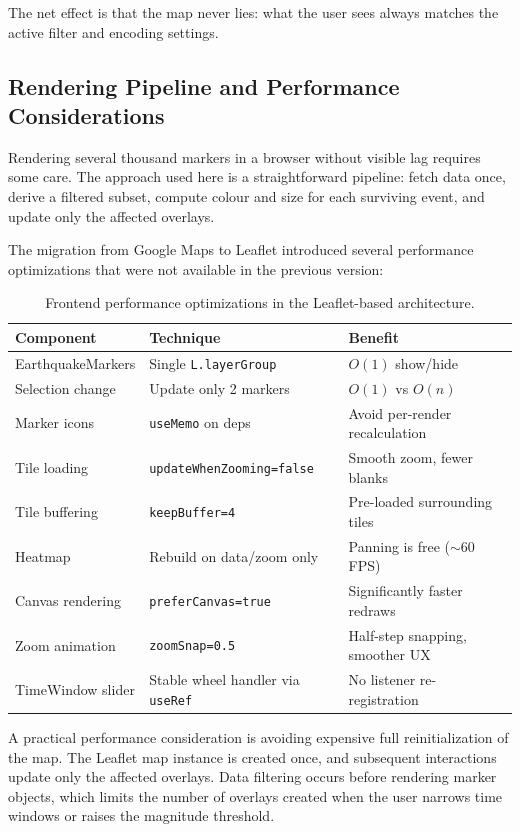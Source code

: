 \documentclass[12pt]{article}
\begin{document}
The net effect is that the map never lies: what the user sees always matches the active filter and encoding settings.

\subsection{Rendering Pipeline and Performance Considerations}
\label{subsec:frontend_performance}

Rendering several thousand markers in a browser without visible lag requires some care. The approach used here is a straightforward pipeline: fetch data once, derive a filtered subset, compute colour and size for each surviving event, and update only the affected overlays.

The migration from Google Maps to Leaflet introduced several performance optimizations that were not available in the previous version:

\begin{table}[H]
\centering
\begin{tabular}{l l l}
\hline
\textbf{Component} & \textbf{Technique} & \textbf{Benefit} \\
\hline
EarthquakeMarkers & Single \texttt{L.layerGroup} & $O(1)$ show/hide \\
Selection change  & Update only 2 markers & $O(1)$ vs $O(n)$ \\
Marker icons      & \texttt{useMemo} on deps & Avoid per-render recalculation \\
Tile loading      & \texttt{updateWhenZooming=false} & Smooth zoom, fewer blanks \\
Tile buffering    & \texttt{keepBuffer=4} & Pre-loaded surrounding tiles \\
Heatmap           & Rebuild on data/zoom only & Panning is free ($\sim$60\,FPS) \\
Canvas rendering  & \texttt{preferCanvas=true} & Significantly faster redraws \\
Zoom animation    & \texttt{zoomSnap=0.5} & Half-step snapping, smoother UX \\
TimeWindow slider & Stable wheel handler via \texttt{useRef} & No listener re-registration \\
\hline
\end{tabular}
\caption{Frontend performance optimizations in the Leaflet-based architecture.}
\label{tab:frontend-perf}
\end{table}

A practical performance consideration is avoiding expensive full reinitialization of the map. The Leaflet map instance is created once, and subsequent interactions update only the affected overlays. Data filtering occurs before rendering marker objects, which limits the number of overlays created when the user narrows time windows or raises the magnitude threshold.
\end{document}
